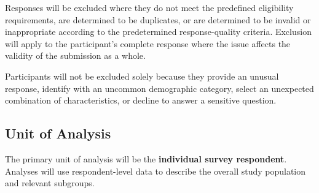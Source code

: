 Responses will be excluded where they do not meet the predefined eligibility requirements, are determined to be duplicates, or are determined to be invalid or inappropriate according to the predetermined response-quality criteria. Exclusion will apply to the participant's complete response where the issue affects the validity of the submission as a whole.

Participants will not be excluded solely because they provide an unusual response, identify with an uncommon demographic category, select an unexpected combination of characteristics, or decline to answer a sensitive question.


\subsection{Unit of Analysis}

The primary unit of analysis will be the \textbf{individual survey respondent}. Analyses will use respondent-level data to describe the overall study population and relevant subgroups.

